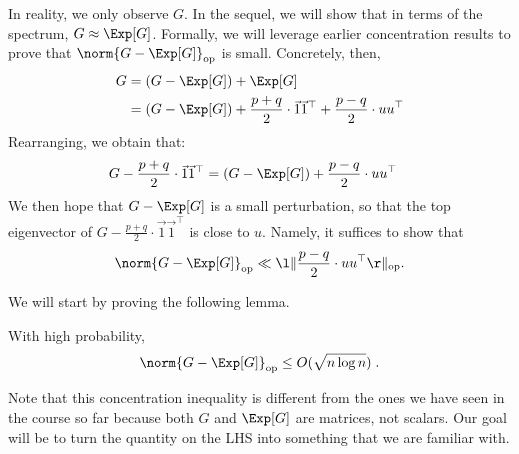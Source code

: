 In reality, we only observe $G$. In the sequel, we will show that in terms of the spectrum, $G \approx \Exp[G]$. Formally, we will leverage earlier concentration results to prove that $\norm{G - \Exp[G]}_{\text{op}}$ is small. Concretely, then,
\begin{align}
    G &= (G - \Exp[G]) + \Exp[G] \\
    &= (G - \Exp[G]) + \frac{p + q}{2} \cdot \vec{1} \vec{1}^\top + \frac{p - q}{2} \cdot u u^\top
\end{align}
Rearranging, we obtain that:
\begin{align}
    G - \frac{p + q}{2} \cdot \vec{1} \vec{1}^\top &= (G - \Exp[G]) + \frac{p - q}{2} \cdot u u^\top
\end{align}
We then hope that $G - \Exp[G]$ is a small perturbation, so that the top eigenvector of $G - \frac{p + q}{2} \cdot \vec{1} \vec{1}^\top$ is close to $u$. Namely, it suffices to show that 
\begin{equation}
    \norm{G - \Exp[G]}_{\text{op}} \ll \l \|\frac{p - q}{2} \cdot uu^\top\r \|_{\text{op}}.
\end{equation}


We will start by proving the following lemma.
\begin{lemma}
With high probability,
\begin{align}
    \norm{ G - \Exp[G] }_{\mathrm{op}} \leq O (\sqrt{n \log n} ) \;.
\end{align}
\end{lemma}

Note that this concentration inequality is different from the ones we have seen in the course so far because both $G$ and $\Exp[G]$ are matrices, not scalars. Our goal will be to turn the quantity on the LHS into something that we are familiar with.

